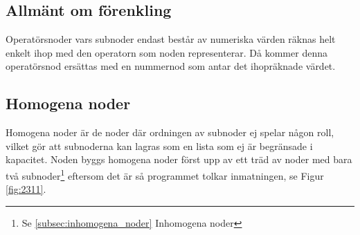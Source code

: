 \documentclass[12pt,a4paper]{article}
\begin{document}
\subsection{Allmänt om förenkling}
Operatörsnoder vars subnoder endast består av numeriska värden räknas helt enkelt ihop med den operatorn som noden representerar. Då kommer denna operatörsnod ersättas med en nummernod som antar det ihopräknade värdet.
\subsection{Homogena noder}
\label{subsec:homogena}
Homogena noder är de noder där ordningen av subnoder ej spelar någon roll, vilket gör att subnoderna kan lagras som en lista som ej är begränsade i kapacitet. Noden byggs homogena noder först upp av ett träd av noder med bara två subnoder\footnote{Se \ref{subsec:inhomogena_noder} Inhomogena noder} eftersom det är så programmet tolkar inmatningen, se Figur \ref{fig:2311}.
\end{document}

